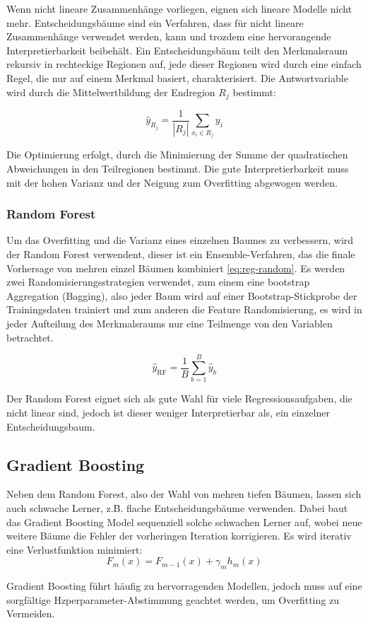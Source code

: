 Wenn nicht lineare Zusammenhänge vorliegen, eignen sich lineare Modelle nicht mehr. Entscheidungsbäume sind ein Verfahren, dass für nicht lineare Zusammenhänge verwendet werden, kann und trozdem eine hervorangende Interpretierbarkeit beibehält. Ein Entscheidungsbäum teilt den Merkmalsraum rekursiv in rechteckige Regionen auf, jede dieser Regionen wird durch eine einfach Regel, die nur auf einem Merkmal basiert, charakterisiert. Die Antwortvariable wird durch die Mittelwertbildung der Endregion \(R_j\) bestimmt:

\begin{equation}
\hat{y}_{R_j} = \frac{1}{|R_j|} \sum_{x_i \in R_j} y_i
\label{eq:reg-tree}
\end{equation}

Die Optimierung erfolgt, durch die Minimierung der Summe der quadratischen Abweichungen in den Teilregionen bestimmt. Die gute Interpretierbarkeit muss mit der hohen Varianz und der Neigung zum Overfitting abgewogen werden.

\subsubsection{Random Forest}
Um das Overfitting und die Varianz eines einzelnen Baumes zu verbessern, wird der Random Forest verwendent, dieser ist ein Ensemble-Verfahren, das die finale Vorhersage von mehren einzel Bäumen kombiniert \ref{eq:reg-random}. Es werden zwei Randomisierungsstrategien verwendet, zum einem eine bootstrap Aggregation (Bagging), also jeder Baum wird auf einer Bootstrap-Stickprobe der Trainingsdaten trainiert und zum anderen die Feature Randomisierung, es wird in jeder Aufteilung des Merkmalsraums nur eine Teilmenge von den Variablen betrachtet. 

\begin{equation}
  \hat{y}_{\text{RF}} = \frac{1}{B} \sum_{b=1}^{B} \hat{y}_b
  \label{eq:reg-random}
\end{equation}

Der Random Forest eignet sich als gute Wahl für viele Regressionsaufgaben, die nicht linear sind, jedoch ist dieser weniger Interpretierbar als, ein einzelner Entscheidungsbaum.

\subsection{Gradient Boosting}
Neben dem Random Forest, also der Wahl von mehren tiefen Bäumen, lassen sich auch schwache Lerner, z.B. flache Entscheidungsbäume verwenden. Dabei baut das Gradient Boosting Model sequenziell solche schwachen Lerner auf, wobei neue weitere Bäume die Fehler der vorheringen Iteration korrigieren. Es wird iterativ eine Verlustfunktion minimiert:
\begin{equation}
  F_m(x) = F_{m-1}(x) + \gamma_m h_m(x)
  \label{eq:reg-grad}
\end{equation}

Gradient Boosting führt häufig zu hervorragenden Modellen, jedoch muss auf eine sorgfältige Hzperparameter-Abstimmung geachtet werden, um Overfitting zu Vermeiden. 


